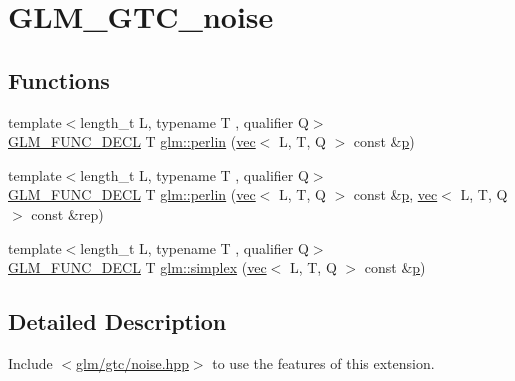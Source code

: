 \hypertarget{group__gtc__noise}{}\section{G\+L\+M\+\_\+\+G\+T\+C\+\_\+noise}
\label{group__gtc__noise}
\subsection*{Functions}
\begin{DoxyCompactItemize}
\item 
{\footnotesize template$<$length\+\_\+t L, typename T , qualifier Q$>$ }\\\mbox{\hyperlink{setup_8hpp_ab2d052de21a70539923e9bcbf6e83a51}{G\+L\+M\+\_\+\+F\+U\+N\+C\+\_\+\+D\+E\+CL}} T \mbox{\hyperlink{group__gtc__noise_ga1e043ce3b51510e9bc4469227cefc38a}{glm\+::perlin}} (\mbox{\hyperlink{structglm_1_1vec}{vec}}$<$ L, T, Q $>$ const \&\mbox{\hyperlink{_s_d_l__opengl__glext_8h_aa5367c14d90f462230c2611b81b41d23}{p}})
\item 
{\footnotesize template$<$length\+\_\+t L, typename T , qualifier Q$>$ }\\\mbox{\hyperlink{setup_8hpp_ab2d052de21a70539923e9bcbf6e83a51}{G\+L\+M\+\_\+\+F\+U\+N\+C\+\_\+\+D\+E\+CL}} T \mbox{\hyperlink{group__gtc__noise_gac270edc54c5fc52f5985a45f940bb103}{glm\+::perlin}} (\mbox{\hyperlink{structglm_1_1vec}{vec}}$<$ L, T, Q $>$ const \&\mbox{\hyperlink{_s_d_l__opengl__glext_8h_aa5367c14d90f462230c2611b81b41d23}{p}}, \mbox{\hyperlink{structglm_1_1vec}{vec}}$<$ L, T, Q $>$ const \&rep)
\item 
{\footnotesize template$<$length\+\_\+t L, typename T , qualifier Q$>$ }\\\mbox{\hyperlink{setup_8hpp_ab2d052de21a70539923e9bcbf6e83a51}{G\+L\+M\+\_\+\+F\+U\+N\+C\+\_\+\+D\+E\+CL}} T \mbox{\hyperlink{group__gtc__noise_ga8122468c69015ff397349a7dcc638b27}{glm\+::simplex}} (\mbox{\hyperlink{structglm_1_1vec}{vec}}$<$ L, T, Q $>$ const \&\mbox{\hyperlink{_s_d_l__opengl__glext_8h_aa5367c14d90f462230c2611b81b41d23}{p}})
\end{DoxyCompactItemize}


\subsection{Detailed Description}
Include $<$\mbox{\hyperlink{noise_8hpp}{glm/gtc/noise.\+hpp}}$>$ to use the features of this extension.

